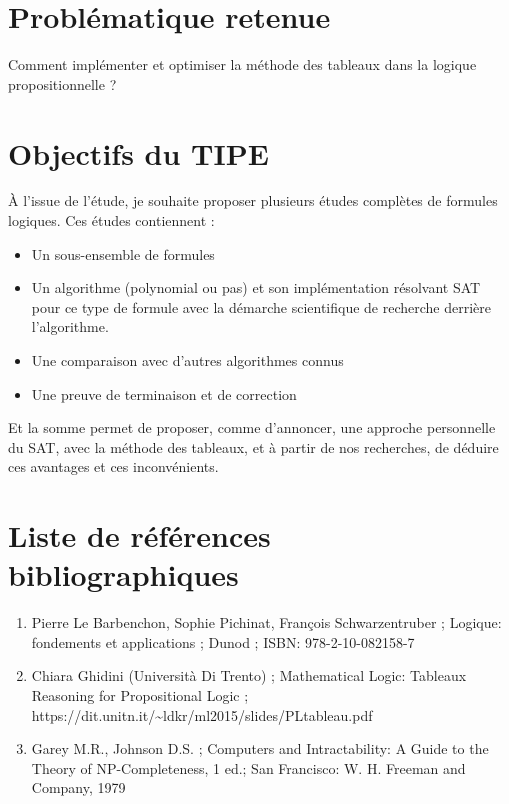 \documentclass{paper}
\begin{document}
\section{Problématique retenue}
Comment implémenter et optimiser la méthode des tableaux dans la logique propositionnelle ?

\section{Objectifs du TIPE}
À l'issue de l'étude, je souhaite proposer plusieurs études complètes de formules logiques. Ces études contiennent :
\begin{itemize}
    \item Un sous-ensemble de formules
    \item Un algorithme (polynomial ou pas) et son implémentation résolvant SAT pour ce type de formule avec la démarche scientifique de recherche derrière l'algorithme.
    \item Une comparaison avec d'autres algorithmes connus
    \item Une preuve de terminaison et de correction
\end{itemize}
Et la somme permet de proposer, comme d'annoncer, une approche personnelle du SAT, avec la méthode des tableaux, et à partir de nos recherches, de déduire  ces avantages et ces inconvénients.

\section{Liste de références bibliographiques}
\begin{enumerate}
    \item Pierre Le Barbenchon, Sophie Pichinat, François Schwarzentruber ; Logique: fondements et applications ; Dunod ; ISBN: 978-2-10-082158-7
    \item Chiara Ghidini (Università Di Trento) ; Mathematical Logic: Tableaux Reasoning for Propositional Logic ; https://dit.unitn.it/\textasciitilde ldkr/ml2015/slides/PLtableau.pdf
    \item Garey M.R., Johnson D.S. ; Computers and Intractability: A Guide to the Theory of NP-Completeness, 1 ed.; San Francisco: W. H. Freeman and Company, 1979
\end{enumerate}
\end{document}
